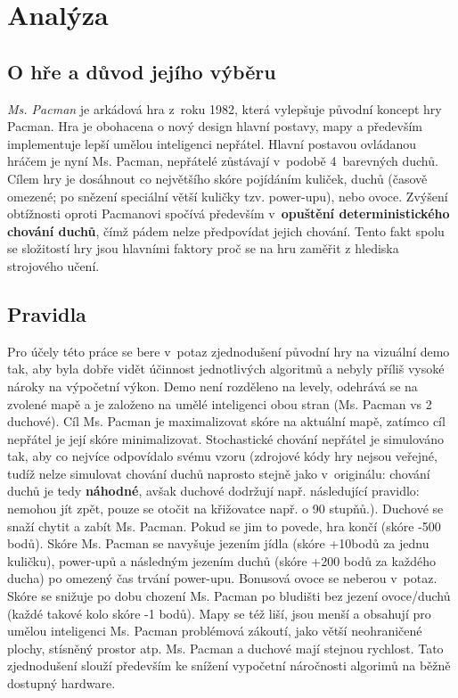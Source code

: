 \section{Analýza}
\label{analyza}
\subsection{O hře a důvod jejího výběru}
\textit{Ms. Pacman} je arkádová hra z roku 1982, která vylepšuje původní koncept hry Pacman. Hra je obohacena o nový design hlavní postavy, mapy a především implementuje lepší umělou inteligenci nepřátel. Hlavní postavou ovládanou hráčem je nyní Ms. Pacman, nepřátelé zůstávají v podobě 4 barevných duchů. Cílem hry je dosáhnout co největšího skóre pojídáním kuliček, duchů (časově omezené; po snězení speciální větší kuličky tzv. power-upu), nebo ovoce.
Zvýšení obtížnosti oproti Pacmanovi spočívá především v \textbf{opuštění deterministického chování duchů}, čímž pádem nelze předpovídat jejich chování. Tento fakt spolu se složitostí hry jsou hlavními faktory proč se na hru zaměřit z hlediska strojového učení.
\subsection{Pravidla}
Pro účely této práce se bere v potaz zjednodušení původní hry na vizuální demo tak, aby byla dobře vidět účinnost jednotlivých algoritmů a nebyly příliš vysoké nároky na výpočetní výkon. Demo není rozděleno na levely, odehrává se na zvolené mapě a je založeno na umělé inteligenci obou stran (Ms. Pacman vs 2 duchové). Cíl Ms. Pacman je maximalizovat skóre na aktuální mapě, zatímco cíl nepřátel je její skóre minimalizovat. Stochastické chování nepřátel je simulováno tak, aby co nejvíce odpovídalo svému vzoru (zdrojové kódy hry nejsou veřejné, tudíž nelze simulovat chování duchů naprosto stejně jako v originálu: chování duchů je tedy \textbf{náhodné}, avšak duchové dodržují např. následující pravidlo: nemohou jít zpět, pouze se otočit na křižovatce např. o 90 stupňů.). Duchové se snaží chytit a zabít Ms. Pacman. Pokud se jim to povede, hra končí (skóre -500 bodů). Skóre Ms. Pacman se navyšuje jezením jídla (skóre +10bodů za jednu kuličku), power-upů a následným jezením duchů (skóre +200 bodů za každého ducha) po omezený čas trvání power-upu. Bonusová ovoce se neberou v potaz. Skóre se snižuje po dobu chození Ms. Pacman po bludišti bez jezení ovoce/duchů (každé takové kolo skóre -1 bodů). Mapy se též liší, jsou menší a obsahují pro umělou inteligenci Ms. Pacman problémová zákoutí, jako větší neohraničené plochy, stísněný prostor atp. Ms. Pacman a duchové mají stejnou rychlost. Tato zjednodušení slouží především ke snížení vypočetní náročnosti algorimů na běžně dostupný hardware.

